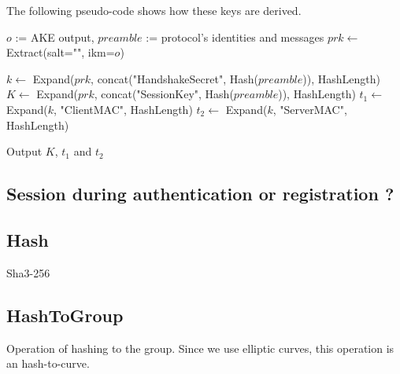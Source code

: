 \documentclass[../report.tex]{subfiles}
\begin{document}
The following pseudo-code shows how these keys are derived.
\begin{algorithmic}
\Require $o$ := AKE output, $preamble$ := protocol's identities and messages
\State $prk \gets$ Extract(salt="", ikm=$o$)


\State $k \gets$ Expand($prk$, concat("HandshakeSecret", Hash($preamble$)), HashLength)
\State $K \gets$ Expand($prk$, concat("SessionKey", Hash($preamble$)), HashLength)
\State $t_1 \gets$ Expand($k$, "ClientMAC", HashLength)
\State $t_2 \gets$ Expand($k$, "ServerMAC", HashLength)

\State Output $K$, $t_1$ and $t_2$
\end{algorithmic}

% 
% 
% 



\subsection{Session during authentication or registration ?}


\subsection{Hash}
Sha3-256

\subsection{HashToGroup}
Operation of hashing to the group. Since we use elliptic curves, this operation is an hash-to-curve.
\end{document}
